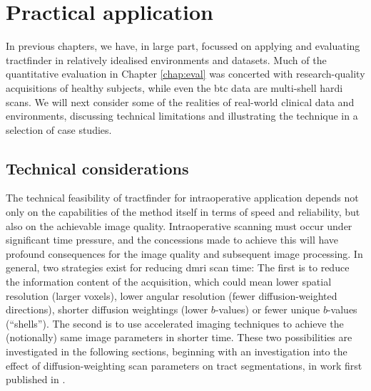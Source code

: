 \chapter{Practical application}
\label{chap:applications}

In previous chapters, we have, in large part, focussed on applying and evaluating tractfinder in relatively idealised environments and datasets.
Much of the quantitative evaluation in Chapter \ref{chap:eval} was concerted with research-quality acquisitions of healthy subjects, while even the \gls{btc} data are multi-shell \gls{hardi} scans.
We will next consider some of the realities of real-world clinical data and environments, discussing technical limitations and illustrating the technique in a selection of case studies.

\section{Technical considerations}\label{sec:technical}

The technical feasibility of tractfinder for intraoperative application depends not only on the capabilities of the method itself in terms of speed and reliability, but also on the achievable image quality.
Intraoperative scanning must occur under significant time pressure, and the concessions made to achieve this will have profound consequences for the image quality and subsequent image processing.
In general, two strategies exist for reducing \gls{dmri} scan time:
The first is to reduce the information content of the acquisition, which could mean lower spatial resolution (larger voxels), lower angular resolution (fewer diffusion-weighted directions), shorter diffusion weightings (lower $b$-values) or fewer unique $b$-values (``shells'').
The second is to use accelerated imaging techniques to achieve the (notionally) same image parameters in shorter time.
These two possibilities are investigated in the following sections, beginning with an investigation into the effect of diffusion-weighting scan parameters on tract segmentations, in work first published in \textcite{Young2022a}.


